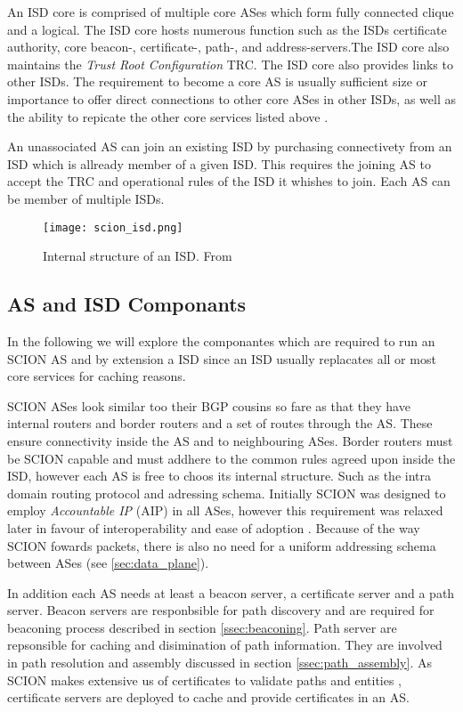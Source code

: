 \documentclass[../eva1_scion.tex]{subfiles}
\begin{document}
    An ISD core is comprised of multiple core ASes which form fully connected clique and a logical. The ISD core hosts numerous function such as the ISDs certificate authority, core beacon-, certificate-, path-, and address-servers.The ISD core also maintains the \textit{Trust Root Configuration} TRC. The ISD core also provides links to other ISDs. The requirement to become a core AS is usually sufficient size or importance to offer direct connections to other core ASes in other ISDs, as well as the ability to repicate the other core services listed above \cite{scion_2011}.

    An unassociated AS can join an existing ISD by purchasing connectivety from an ISD which is allready member of a given ISD. This requires the joining AS to accept the TRC and operational rules of the ISD it whishes to join. Each AS can be member of multiple ISDs.

    \begin{figure}[ht]
        \centering
        \texttt{[image: scion\_isd.png]}
        \caption{Internal structure of an ISD. From \cite{scion_2017}}%
        \label{fig:isd}
    \end{figure}

    \subsection{AS and ISD Componants}

    In the following we will explore the componantes which are required to run an SCION AS and by extension a ISD since an ISD usually replacates all or most core services for caching reasons.

    SCION ASes look similar too their BGP cousins so fare as that they have internal routers and border routers and a set of routes through the AS. These ensure connectivity inside the AS and to neighbouring ASes. Border routers must be SCION capable and must addhere to the common rules agreed upon inside the ISD, however each AS is free to choos its internal structure. Such as the intra domain routing protocol and adressing schema. Initially SCION was designed to employ \textit{Accountable IP} (AIP) \cite{scion_2011, aip_2008} in all ASes, however this requirement was relaxed later in favour of interoperability and ease of adoption \cite{scion_2017}. Because of the way SCION fowards packets, there is also no need for a uniform addressing schema between ASes (see \ref{sec:data_plane}).

    In addition each AS needs at least a beacon server, a certificate server and a path server. Beacon servers are responbsible for path discovery and are required for beaconing process described in section \ref{ssec:beaconing}. Path server are repsonsible for caching and disimination of path information. They are involved in path resolution and assembly discussed in section \ref{ssec:path_assembly}. As SCION makes extensive us of certificates to validate paths and entities \cite{scion_2011}, certificate servers are deployed to cache and provide certificates in an AS.
\end{document}
